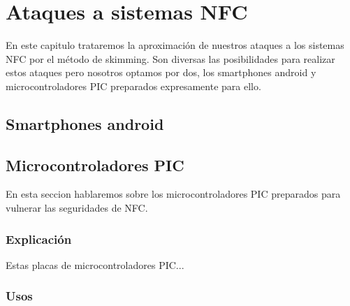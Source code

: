 \chapter{Ataques a sistemas NFC}\label{ch:ataques}
En este capitulo trataremos la aproximación de nuestros ataques a los sistemas NFC por el método de skimming. Son diversas las posibilidades para realizar estos ataques pero nosotros optamos por dos, los smartphones android y microcontroladores PIC preparados expresamente para ello.

\section{Smartphones android}


\section{Microcontroladores PIC}
En esta seccion hablaremos sobre los microcontroladores PIC preparados para vulnerar las seguridades de NFC.
	\subsection{Explicación}
		Estas placas de microcontroladores PIC...
	
	\subsection{Usos}
		